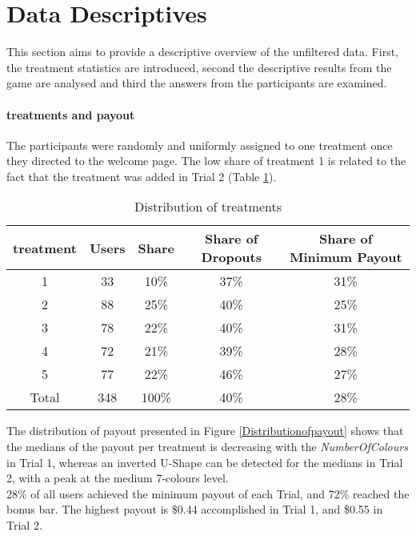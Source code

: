 \section{Data Descriptives}
\label{ch:Experiment:sec:DataacquisitionDescriptives:subsec:DescriptiveStatistics}

This section aims to provide a descriptive overview of the unfiltered data. First, the treatment statistics are introduced, second the descriptive results from the game are analysed and third the answers from the participants are examined.
\paragraph{treatments and payout}
\label{ch:Evaluation:sec:DescriptiveStatistics:subsec:Distributionoftreatments}

The participants were randomly and uniformly assigned to one treatment once they directed to the welcome page. The low share of treatment 1 is related to the fact that the treatment was added in Trial 2 (Table \ref{Distributionoftreatments}).\\ 
\begin{table}[htbp] %
  \centering
  \caption{Distribution of treatments}
    \label{Distributionoftreatments}
    \begin{tabular}{ccc|c|c}
    \toprule
    treatment & Users & Share & Share of Dropouts\footnotemark & Share of Minimum Payout\\
    \midrule
    1     & 33    & 10\%  & 37\% & 31\%\\
    2     & 88    & 25\%  & 40\% & 25\%\\
    3     & 78    & 22\%  & 40\% & 31\%\\
    4     & 72    & 21\%  & 39\% & 28\%\\
    5     & 77    & 22\%  & 46\% & 27\%\\
        \hline
    Total & 348   & 100\% & 40\% & 28\%\\
    \bottomrule
    \end{tabular}%
\end{table}%

The distribution of payout presented in Figure \ref{Distributionofpayout} shows that the medians of the payout per treatment is decreasing with the \textit{NumberOfColours} in Trial 1, whereas an inverted U-Shape can be detected for the medians in Trial 2, with a peak at the medium 7-colours level.\\
28\% of all users achieved the minimum payout of each Trial, and 72\% reached the bonus bar. The highest payout is \$0.44 accomplished in Trial 1, and \$0.55 in Trial 2. 

